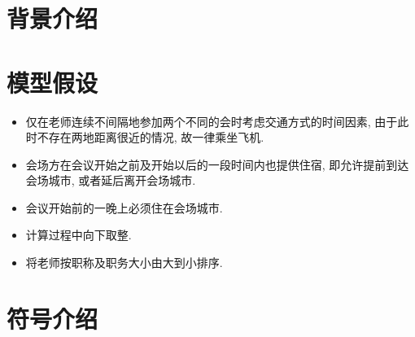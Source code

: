 \documentclass[a4paper,12pt]{ctexart}
\title{\TITLE}
\author{\AUTHOR}
\date{\today}
\begin{document}

    \maketitle
    \thispagestyle{empty}


    \newpage
    


    \newpage
    \tableofcontents


    \newpage
    \pagestyle{fancy}
    \linenumbers
    
    \section{背景介绍} %

    

    \section{模型假设} %

    \begin{itemize}
        \item 仅在老师连续不间隔地参加两个不同的会时考虑交通方式的时间因素,
                  由于此时不存在两地距离很近的情况, 故一律乘坐飞机.
        \item 会场方在会议开始之前及开始以后的一段时间内也提供住宿,
                  即允许提前到达会场城市, 或者延后离开会场城市.
        \item 会议开始前的一晚上必须住在会场城市.
        \item 计算过程中向下取整.
        \item 将老师按职称及职务大小由大到小排序.
    \end{itemize}

    \section{符号介绍}
\end{document}
